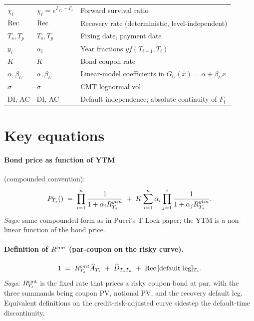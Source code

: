 \documentclass[11pt,a4paper]{article}
\begin{document}
\begin{tabular}{@{}p{3cm}p{3.5cm}p{8.5cm}@{}}
$\chi_t$        & $\chi_t = e^{\Gamma_{T_s}-\Gamma_t}$ & Forward survival ratio \\
$\mathrm{Rec}$          & $\mathrm{Rec}$                        & Recovery rate (deterministic, level-independent) \\
$T_s, T_p$      & $T_s, T_p$                    & Fixing date, payment date \\
$y_i$           & $\alpha_i$                    & Year fractions $yf(T_{i-1},T_i)$ \\
$K$             & $K$                           & Bond coupon rate \\
$\alpha, \beta_U$ & $\alpha, \beta_U$           & Linear-model coefficients in $G_U(x) = \alpha + \beta_U x$ \\
$\sigma$        & $\sigma$                      & CMT lognormal vol \\
DI, AC          & DI, AC                        & Default independence; absolute continuity of $F_t$ \\
\bottomrule
\end{tabular}

\section{Key equations}

\paragraph{Bond price as function of YTM} (compounded convention):
\begin{equation}\label{eq:cmt-ytm}
  P_{T_s}() \;=\; \prod_{i=1}^{n} \frac{1}{1 + \alpha_i R^{ytm}_{T_s}}
                  \;+\; K \sum_{i=1}^n \alpha_i \prod_{j=1}^i \frac{1}{1 + \alpha_j R^{ytm}_{T_s}}.
\end{equation}
\textit{Says:} same compounded form as in Pucci's T-Lock paper; the
YTM is a non-linear function of the bond price.

\paragraph{Definition of $R^{\mathrm{cmt}}$ (par-coupon on the risky curve).}
\begin{equation}\label{eq:cmt-def}
  1 \;=\; R^{cmt}_{T_s} \widehat A_{T_s} \;+\; \widehat D_{T_s T_n} \;+\; \mathrm{Rec}\, [\text{default leg}]_{T_s}.
\end{equation}
\textit{Says:} $R^{\mathrm{cmt}}_{T_s}$ is the fixed rate that prices a risky
coupon bond at par, with the three summands being coupon PV, notional
PV, and the recovery default leg. Equivalent definitions on the
credit-risk-adjusted curve sidestep the default-time discontinuity.
\end{document}
